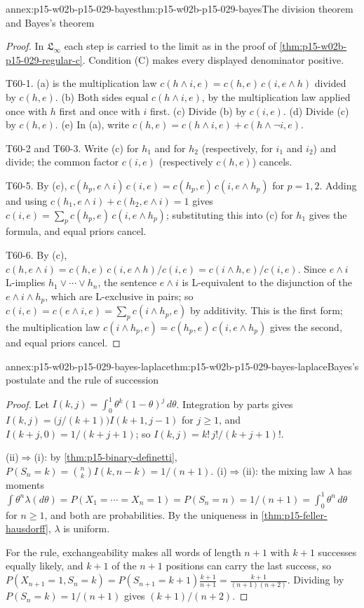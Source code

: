 \begin{annexitem}{annex:p15-w02b-p15-029-bayes}{thm:p15-w02b-p15-029-bayes}{The division theorem and Bayes's theorem}
\begin{proof}
In \(\mathfrak L_\infty\) each step is carried to the limit as in the
proof of \cref{thm:p15-w02b-p15-029-regular-c}. Condition (C) makes
every displayed denominator positive.

T60-1. (a) is the multiplication law
\(c(h\land i,e)=c(h,e)\,c(i,e\land h)\) divided by \(c(h,e)\). (b)
Both sides equal \(c(h\land i,e)\), by the multiplication law applied
once with \(h\) first and once with \(i\) first. (c) Divide (b) by
\(c(i,e)\). (d) Divide (c) by \(c(h,e)\). (e) In (a), write
\(c(h,e)=c(h\land i,e)+c(h\land\neg i,e)\).

T60-2 and T60-3. Write (c) for \(h_1\) and for \(h_2\) (respectively,
for \(i_1\) and \(i_2\)) and divide; the common factor \(c(i,e)\)
(respectively \(c(h,e)\)) cancels.

T60-5. By (c), \(c(h_p,e\land i)\,c(i,e)=c(h_p,e)\,c(i,e\land h_p)\)
for \(p=1,2\). Adding and using \(c(h_1,e\land i)+c(h_2,e\land i)=1\)
gives \(c(i,e)=\sum_pc(h_p,e)\,c(i,e\land h_p)\); substituting this
into (c) for \(h_1\) gives the formula, and equal priors cancel.

T60-6. By (c),
\(c(h,e\land i)=c(h,e)\,c(i,e\land h)/c(i,e)=c(i\land h,e)/c(i,e)\).
Since \(e\land i\) L-implies \(h_1\lor\cdots\lor h_n\), the sentence
\(e\land i\) is L-equivalent to the disjunction of the
\(e\land i\land h_p\), which are L-exclusive in pairs; so
\(c(i,e)=c(e\land i,e)=\sum_pc(i\land h_p,e)\) by additivity. This is
the first form; the multiplication law
\(c(i\land h_p,e)=c(h_p,e)\,c(i,e\land h_p)\) gives the second, and
equal priors cancel.
\end{proof}
\end{annexitem}

\begin{annexitem}{annex:p15-w02b-p15-029-bayes-laplace}{thm:p15-w02b-p15-029-bayes-laplace}{Bayes's postulate and the rule of succession}
\begin{proof}
Let \(I(k,j)=\int_0^1\theta^k(1-\theta)^j\,d\theta\). Integration by
parts gives \(I(k,j)=\bigl(j/(k+1)\bigr)I(k+1,j-1)\) for \(j\geq1\), and
\(I(k+j,0)=1/(k+j+1)\); so \(I(k,j)=k!\,j!/(k+j+1)!\).

(ii)\(\Rightarrow\)(i): by \cref{thm:p15-binary-definetti},
\(P(S_n=k)=\binom nkI(k,n-k)=1/(n+1)\).
(i)\(\Rightarrow\)(ii): the mixing law \(\lambda\) has moments
\(\int\theta^n\lambda(d\theta)=P(X_1=\cdots=X_n=1)=P(S_n=n)=1/(n+1)
=\int_0^1\theta^n\,d\theta\) for \(n\geq1\), and both are
probabilities. By the uniqueness in \cref{thm:p15-feller-hausdorff},
\(\lambda\) is uniform.

For the rule, exchangeability makes all words of length \(n+1\) with
\(k+1\) successes equally likely, and \(k+1\) of the \(n+1\)
positions can carry the last success, so
\(P(X_{n+1}=1,S_n=k)=P(S_{n+1}=k+1)\frac{k+1}{n+1}
=\frac{k+1}{(n+1)(n+2)}\). Dividing by \(P(S_n=k)=1/(n+1)\) gives
\((k+1)/(n+2)\).
\end{proof}
\end{annexitem}

